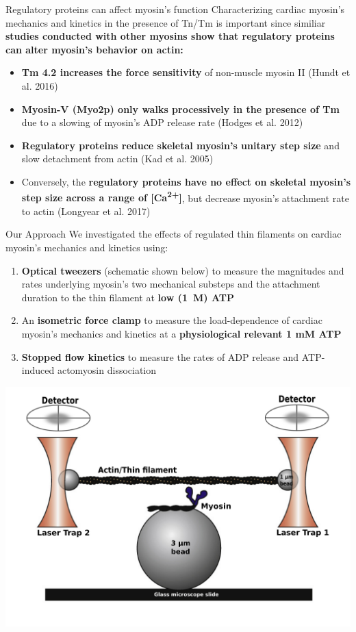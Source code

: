 \documentclass[final]{beamer}
\newlength{\colwidth}
\begin{document}
\begin{frame}[t]
\begin{columns}[t]
\begin{column}{\colwidth}
  \begin{block}{Regulatory proteins can affect myosin's function}
    Characterizing cardiac myosin's mechanics and kinetics in the presence of Tn/Tm is important since similiar \textbf{studies conducted with other myosins show that regulatory proteins can alter myosin's behavior on actin:}
    \begin{itemize}
      \item \textbf{Tm 4.2 increases the force sensitivity} of non-muscle myosin II (Hundt et al. 2016)
      \item \textbf{Myosin-V (Myo2p) only walks processively in the presence of Tm} due to a slowing of myosin's ADP release rate (Hodges et al. 2012)
      \item \textbf{Regulatory proteins reduce skeletal myosin's unitary step size} and slow detachment from actin (Kad et al. 2005)
      \item Conversely, the \textbf{regulatory proteins have no effect on skeletal myosin's step size across a range of [Ca\textsuperscript{2+}]}, but decrease myosin's attachment rate to actin (Longyear et al. 2017)
    \end{itemize}
  \end{block}

  \begin{block}{Our Approach}
    We investigated the effects of regulated thin filaments on cardiac myosin's mechanics and kinetics using:
    \begin{enumerate}
      \item \textbf{Optical tweezers} (schematic shown below) to measure the magnitudes and rates underlying myosin's two mechanical substeps and the attachment duration to the thin filament at \textbf{low (1~{\textmu}M) ATP}
      \item An \textbf{isometric force clamp} to measure the load-dependence of cardiac myosin's mechanics and kinetics at a \textbf{physiological relevant 1 mM ATP}
    \item \textbf{Stopped flow kinetics} to measure the rates of ADP release and ATP-induced actomyosin dissociation
  \end{enumerate}
   \centering \includegraphics[scale=2.3]{traps-cardiac-sm}
  \end{block}


\end{column}
\end{columns}
\end{frame}
\end{document}
